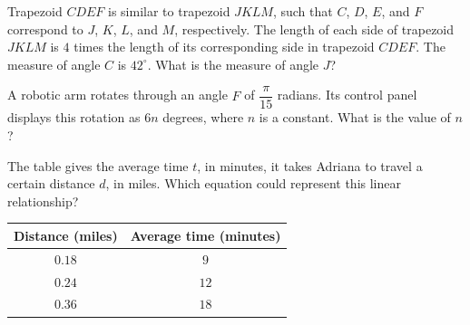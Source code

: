 \vspace{2em}
\newpage

\noindent\markforreview
\vspace{1em}

Trapezoid \(CDEF\) is similar to trapezoid \(JKLM\), such that \(C\), \(D\), \(E\), and \(F\) correspond to \(J\), \(K\), \(L\), and \(M\), respectively. The length of each side of trapezoid \(JKLM\) is \(4\) times the length of its corresponding side in trapezoid \(CDEF\). The measure of angle \(C\) is \(42^\circ\). What is the measure of angle \(J\)?

\vspace{0.75em}


\vspace{2em}
\newpage

\noindent\markforreview
\vspace{1em}

A robotic arm rotates through an angle \(F\) of \(\dfrac{\pi}{15}\) radians. Its control panel displays this rotation as \(6n\) degrees, where \(n\) is a constant. What is the value of \(n\)?

\vspace{2em}
\newpage

\noindent\markforreview
\vspace{1em}

The table gives the average time \(t\), in minutes, it takes Adriana to travel a certain distance \(d\), in miles. Which equation could represent this linear relationship?

\begin{center}
\begin{tabular}{c|c}
Distance (miles) & Average time (minutes) \\
\hline
\(0.18\) & \(9\) \\
\(0.24\) & \(12\) \\
\(0.36\) & \(18\) \\
\end{tabular}
\end{center}

\vspace{0.75em}


\vspace{2em}
\newpage

